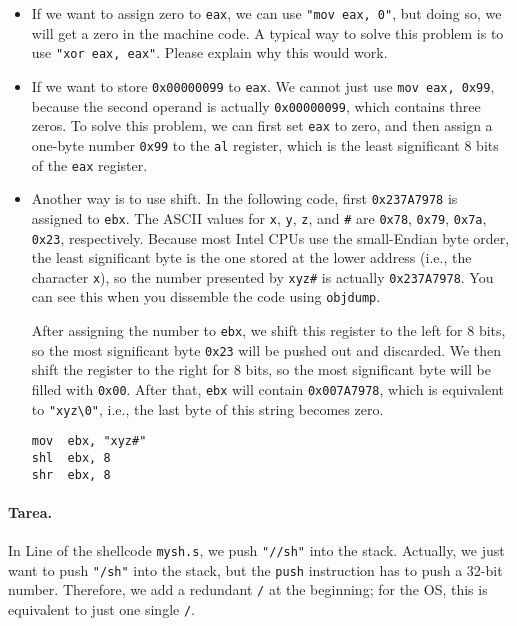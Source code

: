 \begin{itemize}
\item If we want to assign zero to \texttt{eax}, we 
can use \texttt{"mov eax, 0"}, but doing so,
we will get a zero in the machine code. A typical way
to solve this problem is to use \texttt{"xor eax, eax"}. 
Please explain why this would work.

\item If we want to store \texttt{0x00000099} to
\texttt{eax}. We cannot just use \texttt{mov eax, 0x99}, because 
the second operand is actually \texttt{0x00000099}, which contains three zeros. 
To solve this problem, we can first set \texttt{eax} to zero, and then
assign a one-byte number \texttt{0x99} to the \texttt{al} register, which 
is the least significant 8 bits of the \texttt{eax} register. 


\item Another way is to use shift. In the following code,
first \texttt{0x237A7978} is assigned to \texttt{ebx}.
The ASCII values for \texttt{x}, \texttt{y}, \texttt{z}, and \texttt{\#} are 
\texttt{0x78}, \texttt{0x79}, \texttt{0x7a}, \texttt{0x23}, 
respectively. Because most Intel CPUs use the small-Endian byte order,
the least significant byte is the one stored at the lower address (i.e., the
character \texttt{x}), so the number presented by \texttt{xyz\#} is 
actually \texttt{0x237A7978}. You can see this when you dissemble the 
code using \texttt{objdump}. 

After assigning the number to \texttt{ebx},  
we shift this register to the left 
for 8 bits, so the most significant byte \texttt{0x23} will 
be pushed out and discarded. 
We then shift the register to the right for 8 bits,
so the most significant byte will be filled with \texttt{0x00}. 
After that, \texttt{ebx} will contain \texttt{0x007A7978}, 
which is equivalent to \texttt{"xyz\textbackslash 0"}, i.e., the last
byte of this string becomes zero. 

\begin{lstlisting}
mov  ebx, "xyz#"
shl  ebx, 8
shr  ebx, 8
\end{lstlisting}
\end{itemize}


\paragraph{Tarea.}
In Line  of the shellcode \texttt{mysh.s}, 
we push \texttt{"//sh"} into the stack. Actually, we 
just want to push \texttt{"/sh"} into the stack, but 
the \texttt{push} instruction has to push a 32-bit number.
Therefore, we add a redundant \texttt{/} at the beginning; 
for the OS, this is equivalent to just one single \texttt{/}.  


